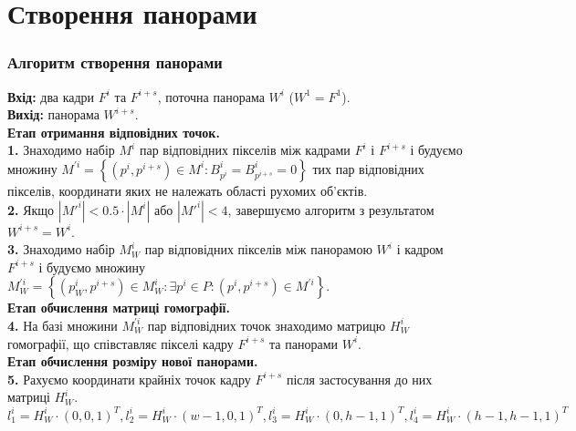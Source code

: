\section{Створення панорами}
\begin{frame}
	\frametitle{Алгоритм створення панорами}
	\textbf{Вхід:} два кадри $F^{i}$ та $F^{i + s}$, поточна панорама $W^{i}$ ($W^{1}
	= F^{1}$). \\ \textbf{Вихід:} панорама $W^{i + s}$. \\ \textbf{Етап отримання
	відповідних точок.} \\ \textbf{1.} Знаходимо набір $M^{i}$ пар відповідних
	пікселів між кадрами $F^{i}$ і $F^{i + s}$ і будуємо множину
	$M^{'i}= \left\{ \left( p^{i},p^{i + s}\right) \in M^{i}:B_{p^{i}}^{i}= B_{p^{i + s}}
	^{i}= 0 \right\}$
	тих пар відповідних пікселів, координати яких не належать області рухомих об'єктів.\\

	\textbf{2.} Якщо $\left|{M'}^{i}\right| < 0.5 \cdot \left| M^{i}\right|$ або $\left
	|{M'}^{i}\right| < 4$, завершуємо алгоритм з результатом $W^{i + s}= W^{i}$.\\

	\textbf{3.} Знаходимо набір $M_{W}^{i}$ пар відповідних пікселів між панорамою
	$W^{i}$ і кадром $F^{i + s}$ і будуємо множину
	$M_{W}^{'i}= \left\{ \left( p_{W}^{i},p^{i + s}\right) \in M_{W}^{i}:\exists p^{i}
	\in P:\left( p^{i},p^{i + s}\right) \in M^{'i}\right\}$. \\

	\textbf{Етап обчислення матриці гомографії.}\\ \textbf{4.} На базі множини $M_{W}
	^{'i}$ пар відповідних точок знаходимо матрицю $H_{W}^{i}$ гомографії, що
	співставляє пікселі кадру $F^{i + s}$ та панорами $W^{i}$. \\

	\textbf{Етап обчислення розміру нової панорами.} \\ \textbf{5.} Рахуємо
	координати крайніх точок кадру $F^{i + s}$ після застосування до них матриці
	$H_{W}^{i}$. $l_{1}^{i}= H_{W}^{i}\cdot (0,0,1)^{T}, l_{2}^{i}= H_{W}^{i}\cdot
	(w - 1,0,1)^{T}, l_{3}^{i}= H_{W}^{i}\cdot (0,h - 1,1)^{T},l_{4}^{i}= H_{W}^{i}
	\cdot (h - 1,h - 1,1)^{T}$
\end{frame}